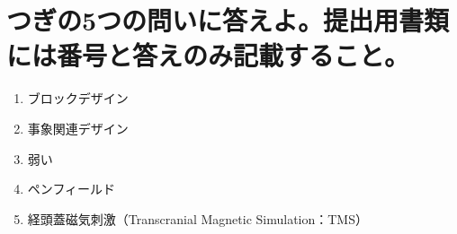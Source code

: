 \documentclass[titlepage,a4paper]{jsarticle}
\begin{document}
\section{つぎの5つの問いに答えよ。提出用書類には番号と答えのみ記載すること。}%
\begin{enumerate}
  \item ブロックデザイン
  \item 事象関連デザイン
  \item 弱い
  \item ペンフィールド
  \item 経頭蓋磁気刺激（Transcranial Magnetic Simulation：TMS）
\end{enumerate}
\end{document}
